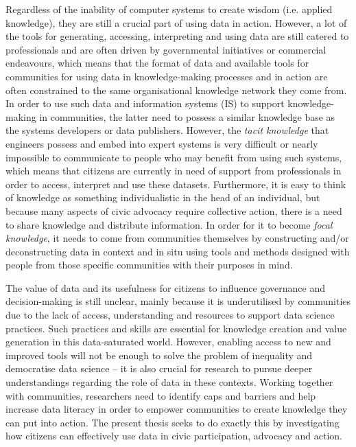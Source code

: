 \begin{introduction}
Regardless of the inability of computer systems to create wisdom (i.e. applied knowledge), they are still a crucial part of using data in action. However, a lot of the tools for generating, accessing, interpreting and using data are still catered to professionals and are often driven by governmental initiatives or commercial endeavours, which means that the format of data and available tools for communities for using data in knowledge-making processes and in action are often constrained to the same organisational knowledge network \citep{hakken_social_2003} they come from. In order to use such data and information systems (IS) to support knowledge-making in communities, the latter need to possess a similar knowledge base as the systems developers or data publishers. However, the \textit{tacit knowledge} \citep{polanyi_tacit_2009} that engineers possess and embed into expert systems is very difficult or nearly impossible to communicate to people who may benefit from using such systems, which means that citizens are currently in need of support from professionals in order to access, interpret and use these datasets. Furthermore, it is easy to think of knowledge as something individualistic in the head of an individual, but because many aspects of civic advocacy require collective action, there is a need to share knowledge and distribute information. In order for it to become \textit{focal knowledge}, it needs to come from communities themselves by constructing and/or deconstructing data in context and in situ \citep{suchman_plans_1985} using tools and methods designed with people from those specific communities with their purposes in mind.

The value of data and its usefulness for citizens to influence governance and decision-making is still unclear, mainly because it is underutilised by communities due to the lack of access, understanding and resources to support data science practices. Such practices and skills are essential for knowledge creation and value generation in this data-saturated world. However, enabling access to new and improved tools will not be enough to solve the problem of inequality and democratise data science -- it is also crucial for research to pursue deeper understandings regarding the role of data in these contexts. Working together with communities, researchers need to identify caps and barriers and help increase data literacy in order to empower communities to create knowledge they can put into action. The present thesis seeks to do exactly this by investigating how citizens can effectively use data in civic participation, advocacy and action. 
\clearpage


\end{introduction}
